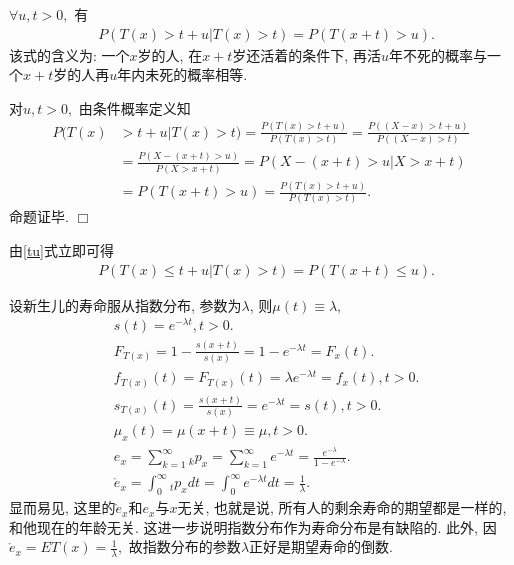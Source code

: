 \documentclass[a4paper,10pt]{ctexbook}
\def\qed{\hfill$\Box$\medskip}
\begin{document}
\begin{proposition}$\forall u,t>0,$ 有
    \begin{align}
         & P(T(x)>t+u|T(x)>t)=P(T(x+t)>u).\label{tu}
    \end{align}
    该式的含义为: 一个$x$岁的人, 在$x+t$岁还活着的条件下, 再活$u$年不死的概率与一个$x+t$岁的人再$u$年内未死的概率相等.
\end{proposition}

\proof 对$u,t>0,$ 由条件概率定义知
\begin{align*}
    P(T(x) & >t+u|T(x)>t)=\frac{P(T(x)>t+u)}{P(T(x)>t)}=\frac{P((X-x)>t+u)}{P((X-x)>t)} \\
           & =\frac{P(X-(x+t)>u)}{P(X>x+t)}=  P(X-(x+t)>u|X>x+t)                        \\
           & =P(T(x+t)>u)=\frac{P(T(x)>t+u)}{P(T(x)>t)}.
\end{align*}
命题证毕. \qed

\begin{remark}由\eqref{tu}式立即可得
    \begin{align}\label{tul}
         & P(T(x)\leq t+u|T(x)>t)=P(T(x+t)\leq u).
    \end{align}
\end{remark}
\begin{example}
    设新生儿的寿命服从指数分布, 参数为$\lambda$, 则$\mu(t)\equiv\lambda,$
    \begin{align*}
         & s(t)=e^{-\lambda t},t>0.                                                                                       \\
         & F_{T(x)}=1-\frac{s(x+t)}{s(x)}=1-e^{- \lambda t}=F_x(t).                                                       \\
         & f_{T(x)}(t)=F_{T(x)}(t)=\lambda e^{- \lambda t}=f_x(t),t>0.                                                    \\
         & s_{T(x)}(t)=\frac{s(x+t)}{s(x)}=e^{-\lambda t}=s(t),t>0.                                                       \\
         & \mu_x(t)=\mu(x+t)\equiv\mu,t>0.                                                                                \\
         & e_x = \sum_{k=1}^{\infty} {_kp_x}=\sum_{k=1}^{\infty} {e^{- \lambda t}}=\frac{e^{- \lambda}}{1-e^{- \lambda}}. \\
         & \mathring{e}_x=\int_{0}^{\infty}{_tp_x}dt=\int_{0}^{\infty}{e^{- \lambda t}}dt=\frac{1}{\lambda}.
    \end{align*}
    显而易见, 这里的$\mathring e_x $和$e_x$与$x$无关, 也就是说,  所有人的剩余寿命的期望都是一样的, 和他现在的年龄无关. 这进一步说明指数分布作为寿命分布是有缺陷的.   此外, 因$\mathring{e}_x=ET(x)=\frac{1}{\lambda},$ 故指数分布的参数$\lambda$正好是期望寿命的倒数.
\end{example}
\end{document}
